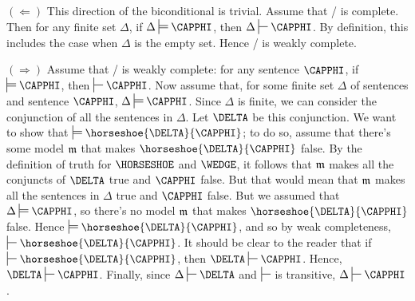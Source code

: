 \begin{PROOF}
	$(\Leftarrow)$ This direction of the biconditional is trivial. 
	Assume that \GSD{}/\GQD{} is complete. 
	Then for any finite set $\Delta$, if $\Delta\sdtstile{}{}\CAPPHI$, then $\Delta\sststile{}{}\CAPPHI$. 
	By definition, this includes the case when $\Delta$ is the empty set. 
	Hence \GSD{}/\GQD{} is weakly complete. 
	
	$(\Rightarrow)$ Assume that \GSD{}/\GQD{} is weakly complete: for any sentence $\CAPPHI$, if $\sdtstile{}{}\CAPPHI$, then $\sststile{}{}\CAPPHI$. 
	Now assume that, for some finite set $\Delta$ of sentences and sentence $\CAPPHI$, $\Delta\sdtstile{}{}\CAPPHI$.
	Since $\Delta$ is finite, we can consider the conjunction of all the sentences in $\Delta$.
	Let $\DELTA$ be this conjunction. 
	We want to show that $\sdtstile{}{}\horseshoe{\DELTA}{\CAPPHI}$;
	to do so, assume that there's some model $\mathfrak{m}$ that makes $\horseshoe{\DELTA}{\CAPPHI}$ false.
	By the definition of truth for $\HORSESHOE$ and $\WEDGE$, it follows that $\mathfrak{m}$ makes all the conjuncts of $\DELTA$ true and $\CAPPHI$ false. 
	But that would mean that $\mathfrak{m}$ makes all the sentences in $\Delta$ true and $\CAPPHI$ false.
	But we assumed that $\Delta\sdtstile{}{}\CAPPHI$, so there's no model $\mathfrak{m}$ that makes $\horseshoe{\DELTA}{\CAPPHI}$ false.
	Hence $\sdtstile{}{}\horseshoe{\DELTA}{\CAPPHI}$, and so by weak completeness, $\sststile{}{}\horseshoe{\DELTA}{\CAPPHI}$.
	It should be clear to the reader that if $\sststile{}{}\horseshoe{\DELTA}{\CAPPHI}$, then $\DELTA\sststile{}{}\CAPPHI$.
	Hence, $\DELTA\sststile{}{}\CAPPHI$.
	Finally, since $\Delta\sststile{}{}\DELTA$ and $\sststile{}{}$ is transitive, $\Delta\sststile{}{}\CAPPHI$.
\end{PROOF}
